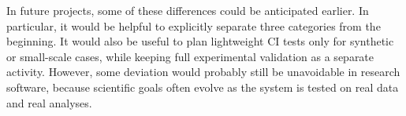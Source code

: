 \documentclass[12pt, titlepage]{article}
\begin{document}
\begin{enumerate}
  In future projects, some of these differences could be anticipated earlier.
  In particular, it would be helpful to explicitly separate three categories from the beginning.
  It would also be useful to plan lightweight CI tests only for synthetic or small-scale cases, while keeping full experimental validation as a separate activity.
  However, some deviation would probably still be unavoidable in research software, because scientific goals often evolve as the system is tested on real data and real analyses.
\end{enumerate}
\end{document}
